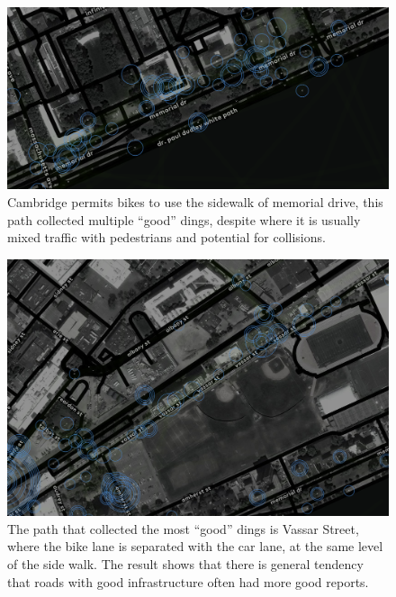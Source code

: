 \begin{figure}[!htb]
  \includegraphics{appendix/G/fig/good_memorial.png}               
  \caption[``good'' reports in sidewalks of memorial drive]{Cambridge permits bikes to use the sidewalk of memorial drive, this path collected multiple ``good'' dings, despite where it is usually mixed traffic with pedestrians and potential for collisions.}
  \label{fig:good_memorial}
\end{figure}

\begin{figure}[!htb]
  \includegraphics{appendix/G/fig/good_vassar.png}               
  \caption[``good'' reports in sidewalks of Vassar Street]{
  The path that collected the most ``good'' dings is Vassar Street, where the bike lane is separated with the car lane, at the same level of the side walk. The result shows that there is general tendency that roads with good infrastructure often had more good reports.}
  \label{fig:good_vassar}
\end{figure}